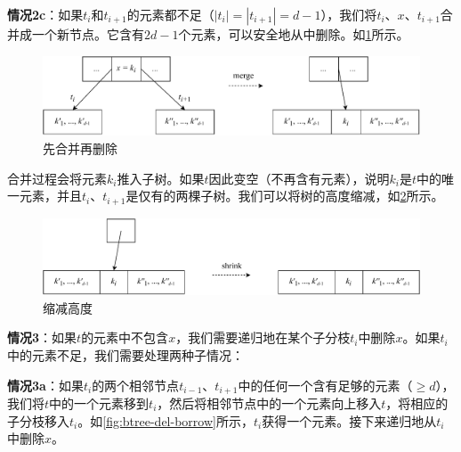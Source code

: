 \documentclass[b5paper]{ctexart}
\begin{document}
\textbf{情况2c}：如果$t_i$和$t_{i+1}$的元素都不足（$|t_i| = |t_{i+1}| = d - 1$），我们将$t_i$、$x$、$t_{i+1}$合并成一个新节点。它含有$2d - 1$个元素，可以安全地从中删除。如\cref{fig:btree-del-merge}所示。

\begin{figure}[htbp]
  \centering
  \includegraphics[scale=0.65]{img/btree-del-merge}
  \caption{先合并再删除}
  \label{fig:btree-del-merge}
\end{figure}

合并过程会将元素$k_i$推入子树。如果$t$因此变空（不再含有元素），说明$k_i$是$t$中的唯一元素，并且$t_i$、$t_{i+1}$是仅有的两棵子树。我们可以将树的高度缩减，如\cref{fig:btree-del-shrink}所示。

\begin{figure}[htbp]
  \centering
  \includegraphics[scale=0.65]{img/btree-del-shrink}
  \caption{缩减高度}
  \label{fig:btree-del-shrink}
\end{figure}

\textbf{情况3}：如果$t$的元素中不包含$x$，我们需要递归地在某个子分枝$t_i$中删除$x$。如果$t_i$中的元素不足，我们需要处理两种子情况：

\textbf{情况3a}：如果$t_i$的两个相邻节点$t_{i-1}$、$t_{i+1}$中的任何一个含有足够的元素（$\geq d$），我们将$t$中的一个元素移到$t_i$，然后将相邻节点中的一个元素向上移入$t$，将相应的子分枝移入$t_i$。如\cref{fig:btree-del-borrow}所示，$t_i$获得一个元素。接下来递归地从$t_i$中删除$x$。
\end{document}

